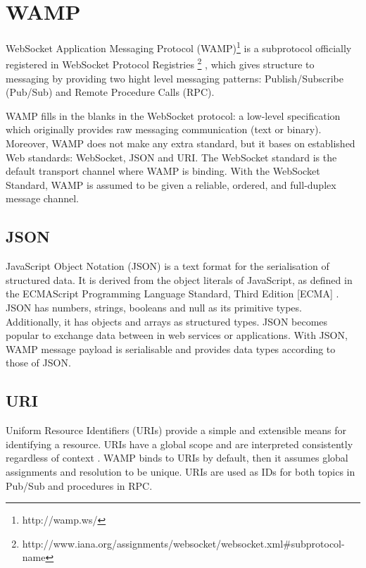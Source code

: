 \section{WAMP}

WebSocket Application Messaging Protocol (WAMP)\footnote{http://wamp.ws/} is a subprotocol officially registered in WebSocket Protocol Registries \footnote{http://www.iana.org/assignments/websocket/websocket.xml\#subprotocol-name} , which gives structure to messaging by providing two hight level messaging patterns: Publish/Subscribe (Pub/Sub) and Remote Procedure Calls (RPC).

WAMP fills in the blanks in the WebSocket protocol: a low-level specification which originally provides raw messaging communication (text or binary). Moreover, WAMP does not make any extra standard, but it bases on established Web standards: WebSocket, JSON and URI. The WebSocket standard is the default transport channel where WAMP is binding. With the WebSocket Standard, WAMP is assumed to be given a reliable, ordered, and full-duplex message channel. 

\subsection{JSON}

JavaScript Object Notation (JSON) is a text format for the serialisation of structured data. It is derived from the object literals of JavaScript, as defined in the ECMAScript Programming Language Standard, Third Edition [ECMA] \cite{crockford2006application}. JSON has numbers, strings, booleans and null as its primitive types. Additionally, it has objects and arrays as structured types. JSON becomes popular to exchange data between in web services or applications. With JSON, WAMP message payload is serialisable and provides data types according to those of JSON. 

\subsection{URI}

Uniform Resource Identifiers (URIs) provide a simple and extensible means for identifying a resource. URIs have a global scope and are interpreted consistently regardless of context \cite{masinter2005uniform}. WAMP binds to URIs by default, then it assumes global assignments and resolution to be unique. URIs are used as IDs for both topics in Pub/Sub and procedures in RPC. 

